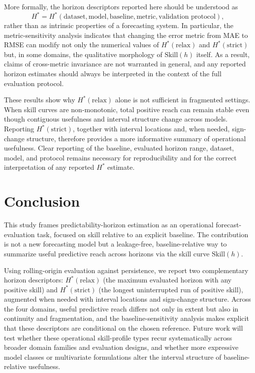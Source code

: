 \documentclass[pdflatex]{sn-jnl}
\begin{document}
More formally, the horizon descriptors reported here should be understood as
\[
H^* = H^*(\text{dataset}, \text{model}, \text{baseline}, \text{metric}, \text{validation protocol}),
\]
rather than as intrinsic properties of a forecasting system. In particular, the metric-sensitivity analysis indicates that changing the error metric from MAE to RMSE can modify not only the numerical values of $H^*(\mathrm{relax})$ and $H^*(\mathrm{strict})$ but, in some domains, the qualitative morphology of $\mathrm{Skill}(h)$ itself. As a result, claims of cross-metric invariance are not warranted in general, and any reported horizon estimates should always be interpreted in the context of the full evaluation protocol.

These results show why $H^*(\mathrm{relax})$ alone is not sufficient in
fragmented settings. When skill curves are non-monotonic, total positive
reach can remain stable even though contiguous usefulness and interval
structure change across models. Reporting $H^*(\mathrm{strict})$,
together with interval locations and, when needed, sign-change
structure, therefore provides a more informative summary of operational
usefulness. Clear reporting of the baseline, evaluated horizon range,
dataset, model, and protocol remains necessary for reproducibility and
for the correct interpretation of any reported $H^*$ estimate.


\section{Conclusion}

This study frames predictability-horizon estimation as an operational
forecast-evaluation task, focused on skill relative to an explicit
baseline. The contribution is not a new forecasting model but a
leakage-free, baseline-relative way to summarize useful predictive reach
across horizons via the skill curve $\mathrm{Skill}(h)$.

Using rolling-origin evaluation against persistence, we report two
complementary horizon descriptors: $H^*(\mathrm{relax})$ (the maximum
evaluated horizon with any positive skill) and $H^*(\mathrm{strict})$
(the longest uninterrupted run of positive skill), augmented when needed
with interval locations and sign-change structure. Across the four
domains, useful predictive reach differs not only in extent but also in
continuity and fragmentation, and the baseline-sensitivity analysis makes
explicit that these descriptors are conditional on the chosen reference.
Future work will test whether these
operational skill-profile types recur systematically across broader
domain families and evaluation designs, and whether more expressive model
classes or multivariate formulations alter the interval structure of
baseline-relative usefulness.
\end{document}
